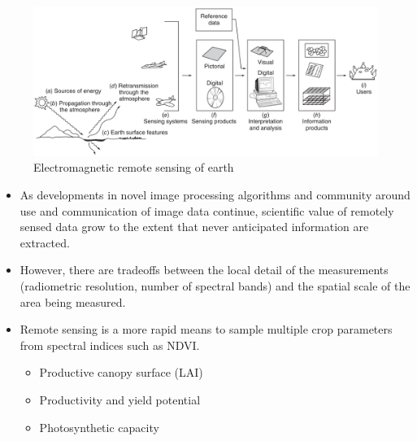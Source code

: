 \documentclass[10pt,dvipsnames,ignorenonframetext,aspectratio=169]{beamer}
\providecommand{\tightlist}{%
  \setlength{\itemsep}{0pt}\setlength{\parskip}{0pt}}
\begin{document}
\begin{frame}{}
\protect\hypertarget{section-2}{}
\begin{figure}
\includegraphics[width=0.88\linewidth]{../images/remote-sensing-of-electromagnetic-radiation-earth} \caption{Electromagnetic remote sensing of earth}\label{fig:electromagnetic-remote-sensing}
\end{figure}
\end{frame}

\begin{frame}{}
\protect\hypertarget{section-3}{}
\begin{itemize}
\tightlist
\item
  As developments in novel image processing algorithms and community
  around use and communication of image data continue, scientific value
  of remotely sensed data grow to the extent that never anticipated
  information are extracted.
\item
  However, there are tradeoffs between the local detail of the
  measurements (radiometric resolution, number of spectral bands) and
  the spatial scale of the area being measured.
\item
  Remote sensing is a more rapid means to sample multiple crop
  parameters from spectral indices such as NDVI.

  \begin{itemize}
  \tightlist
  \item
    Productive canopy surface (LAI)
  \item
    Productivity and yield potential
  \item
    Photosynthetic capacity
  \end{itemize}
\end{itemize}
\end{frame}
\end{document}
